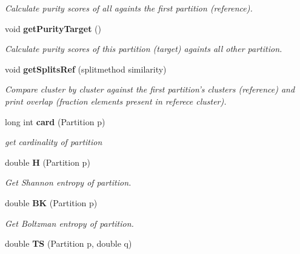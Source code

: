 \begin{CompactItemize}
\begin{CompactList}\small\item\em Calculate purity scores of all againts the first partition (reference). \item\end{CompactList}\item 
void {\bf get\-Purity\-Target} ()\label{classPartitionStats_a24}

\begin{CompactList}\small\item\em Calculate purity scores of this partition (target) againts all other partition. \item\end{CompactList}\item 
void {\bf get\-Splits\-Ref} (splitmethod similarity)\label{classPartitionStats_a25}

\begin{CompactList}\small\item\em Compare cluster by cluster against the first partition's clusters (reference) and print overlap (fraction elements present in referece cluster). \item\end{CompactList}\item 
long int {\bf card} (Partition p)\label{classPartitionStats_a26}

\begin{CompactList}\small\item\em get cardinality of partition \item\end{CompactList}\item 
double {\bf H} (Partition p)\label{classPartitionStats_a27}

\begin{CompactList}\small\item\em Get Shannon entropy of partition. \item\end{CompactList}\item 
double {\bf BK} (Partition p)\label{classPartitionStats_a28}

\begin{CompactList}\small\item\em Get Boltzman entropy of partition. \item\end{CompactList}\item 
double {\bf TS} (Partition p, double q)\label{classPartitionStats_a29}


\end{CompactItemize}
